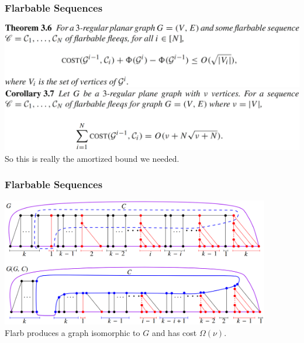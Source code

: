 \begin{frame} \frametitle{Flarbable Sequences} \label{pg:upperbound}
\begin{center}
	\includegraphics[width=14cm]{figs/3-6.png} \\ \vspace{0.5cm}
	\includegraphics[width=14cm]{figs/3-7.png} \\ \vspace{0.3cm}
	So this is really the amortized bound we needed.
\end{center}
\end{frame}

\begin{frame} \frametitle{Flarbable Sequences}
\begin{center}
	\includegraphics[width=11.75cm]{figs/halin-iso.png} \\ \vspace{0.5cm}
	Flarb produces a graph isomorphic to $G$ and has cost $\Omega \left( \nu \right)$.
\end{center}
\end{frame}